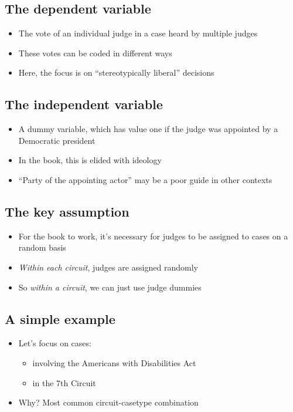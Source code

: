 \documentclass[12pt,twoside]{article}
\providecommand{\tightlist}{%
  \setlength{\itemsep}{0pt}\setlength{\parskip}{0pt}}
\begin{document}
\subsection{The dependent variable}\label{the-dependent-variable}

\begin{itemize}
\tightlist
\item
  The vote of an individual judge in a case heard by multiple judges
\item
  These votes can be coded in different ways
\item
  Here, the focus is on ``stereotypically liberal'' decisions
\end{itemize}

\subsection{The independent variable}\label{the-independent-variable}

\begin{itemize}
\tightlist
\item
  A dummy variable, which has value one if the judge was appointed by a
  Democratic president
\item
  In the book, this is elided with ideology
\item
  ``Party of the appointing actor'' may be a poor guide in other
  contexts
\end{itemize}

\subsection{The key assumption}\label{the-key-assumption}

\begin{itemize}
\tightlist
\item
  For the book to work, it's necessary for judges to be assigned to
  cases on a random basis
\item
  \emph{Within each circuit}, judges are assigned randomly
\item
  So \emph{within a circuit}, we can just use judge dummies
\end{itemize}

\subsection{A simple example}\label{a-simple-example}

\begin{itemize}
\tightlist
\item
  Let's focus on cases:

  \begin{itemize}
  \tightlist
  \item
    involving the Americans with Disabilities Act
  \item
    in the 7th Circuit
  \end{itemize}
\item
  Why? Most common circuit-casetype combination
\end{itemize}
\end{document}
